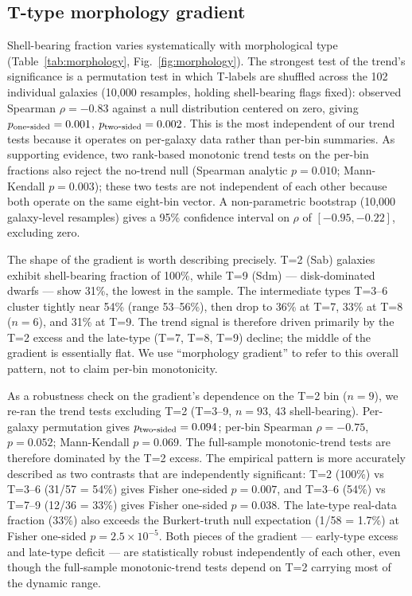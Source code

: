 \subsection{T-type morphology gradient}
\label{sec:morphology}

Shell-bearing fraction varies systematically with morphological type (Table~\ref{tab:morphology}, Fig.~\ref{fig:morphology}). The strongest test of the trend's significance is a permutation test in which T-labels are shuffled across the 102 individual galaxies (10{,}000 resamples, holding shell-bearing flags fixed): observed Spearman $\rho = -0.83$ against a null distribution centered on zero, giving $p_{\rm one\mbox{-}sided} = 0.001$, $p_{\rm two\mbox{-}sided} = 0.002$. This is the most independent of our trend tests because it operates on per-galaxy data rather than per-bin summaries. As supporting evidence, two rank-based monotonic trend tests on the per-bin fractions also reject the no-trend null (Spearman analytic $p = 0.010$; Mann-Kendall $p = 0.003$); these two tests are not independent of each other because both operate on the same eight-bin vector. A non-parametric bootstrap (10{,}000 galaxy-level resamples) gives a 95\% confidence interval on $\rho$ of $[-0.95, -0.22]$, excluding zero.

The shape of the gradient is worth describing precisely. T=2 (Sab) galaxies exhibit shell-bearing fraction of 100\%, while T=9 (Sdm) --- disk-dominated dwarfs --- show 31\%, the lowest in the sample. The intermediate types T=3--6 cluster tightly near 54\% (range 53--56\%), then drop to 36\% at T=7, 33\% at T=8 ($n=6$), and 31\% at T=9. The trend signal is therefore driven primarily by the T=2 excess and the late-type (T=7, T=8, T=9) decline; the middle of the gradient is essentially flat. We use ``morphology gradient'' to refer to this overall pattern, not to claim per-bin monotonicity.

As a robustness check on the gradient's dependence on the T=2 bin ($n=9$), we re-ran the trend tests excluding T=2 (T=3--9, $n=93$, 43 shell-bearing). Per-galaxy permutation gives $p_{\rm two\mbox{-}sided} = 0.094$; per-bin Spearman $\rho = -0.75$, $p = 0.052$; Mann-Kendall $p = 0.069$. The full-sample monotonic-trend tests are therefore dominated by the T=2 excess. The empirical pattern is more accurately described as two contrasts that are independently significant: T=2 (100\%) vs T=3--6 (31/57 = 54\%) gives Fisher one-sided $p = 0.007$, and T=3--6 (54\%) vs T=7--9 (12/36 = 33\%) gives Fisher one-sided $p = 0.038$. The late-type real-data fraction (33\%) also exceeds the Burkert-truth null expectation (1/58 = 1.7\%) at Fisher one-sided $p = 2.5 \times 10^{-5}$. Both pieces of the gradient --- early-type excess and late-type deficit --- are statistically robust independently of each other, even though the full-sample monotonic-trend tests depend on T=2 carrying most of the dynamic range.

